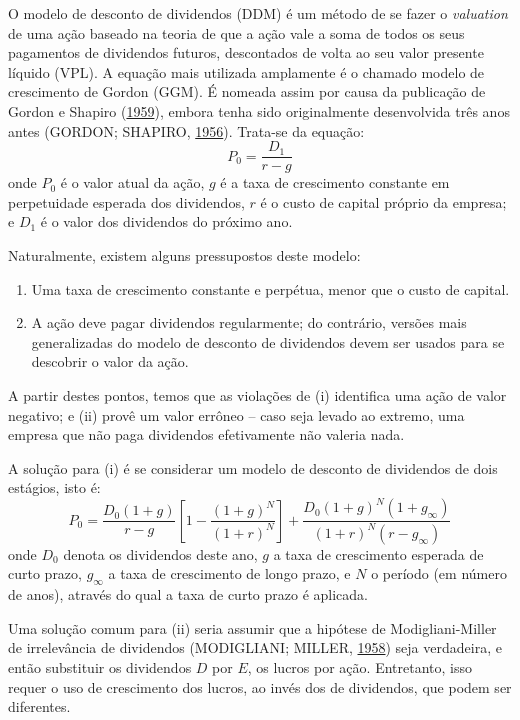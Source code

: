 \documentclass[grad,numbers]{coppe}
\providecommand{\tightlist}{%
  \setlength{\itemsep}{0pt}\setlength{\parskip}{0pt}}
\begin{document}
  O modelo de desconto de dividendos (DDM) é um método de se fazer o \emph{valuation} de uma ação baseado na teoria de que a ação vale a soma de todos os seus pagamentos de dividendos futuros, descontados de volta ao seu valor presente líquido (VPL). A equação mais utilizada amplamente é o chamado modelo de crescimento de Gordon (GGM). É nomeada assim por causa da publicação de Gordon e Shapiro (\protect\hyperlink{ref-gordon1959}{1959}), embora tenha sido originalmente desenvolvida três anos antes (GORDON; SHAPIRO, \protect\hyperlink{ref-gordon1956}{1956}). Trata-se da equação:
  \[
  P_0 = \frac{D_1}{r-g}
  \]
  onde \(P_0\) é o valor atual da ação, \(g\) é a taxa de crescimento constante em perpetuidade esperada dos dividendos, \(r\) é o custo de capital próprio da empresa; e \(D_1\) é o valor dos dividendos do próximo ano.

  Naturalmente, existem alguns pressupostos deste modelo:
  \begin{enumerate}
  \def\labelenumi{\roman{enumi}.}
  \tightlist
  \item
    Uma taxa de crescimento constante e perpétua, menor que o custo de capital.
  \item
    A ação deve pagar dividendos regularmente; do contrário, versões mais generalizadas do modelo de desconto de dividendos devem ser usados para se descobrir o valor da ação.
  \end{enumerate}
  A partir destes pontos, temos que as violações de (i) identifica uma ação de valor negativo; e (ii) provê um valor errôneo -- caso seja levado ao extremo, uma empresa que não paga dividendos efetivamente não valeria nada.

  A solução para (i) é se considerar um modelo de desconto de dividendos de dois estágios, isto é:
  \[
  P_0 = \frac{D_0 (1+g)}{r-g} \left[1 - \frac{(1+g)^N}{(1+r)^N}\right] + \frac{D_0 (1+g)^N (1+g_\infty)}{(1+r)^N (r-g_\infty)}
  \]
  onde \(D_0\) denota os dividendos deste ano, \(g\) a taxa de crescimento esperada de curto prazo, \(g_\infty\) a taxa de crescimento de longo prazo, e \(N\) o período (em número de anos), através do qual a taxa de curto prazo é aplicada.

  Uma solução comum para (ii) seria assumir que a hipótese de Modigliani-Miller de irrelevância de dividendos (MODIGLIANI; MILLER, \protect\hyperlink{ref-modigliani1958}{1958}) seja verdadeira, e então substituir os dividendos \(D\) por \(E\), os lucros por ação. Entretanto, isso requer o uso de crescimento dos lucros, ao invés dos de dividendos, que podem ser diferentes.
\end{document}
